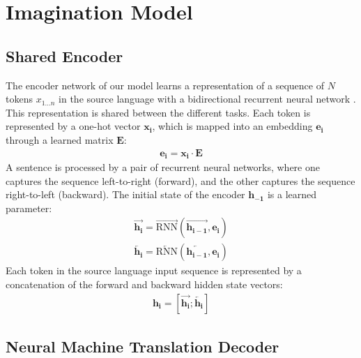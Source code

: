 \section{Imagination Model}

\subsection{Shared Encoder}\label{sec:model:encoder}

The encoder network of our model learns a representation of a
sequence of $N$ tokens $x_{1 \ldots n}$ in the source language with a
bidirectional recurrent neural network \citep{Schuster1997}. This representation is shared between the different tasks. 
Each token is represented by a one-hot vector $\mathbf{x_i}$, which is mapped into an embedding $\mathbf{e_i}$ through a learned matrix
$\mathbf{E}$:
%
\begin{align}
	\mathbf{e_i} = \mathbf{x_i} \cdot \mathbf{E}
\end{align}
%
A sentence is processed by a pair of recurrent neural networks, where one captures the sequence left-to-right (forward), and the other captures the sequence right-to-left (backward). The initial state of the encoder $\mathbf{h_{-1}}$ is a learned parameter:
%
\begin{align}
	\overrightarrow{\mathbf{h_i}} = \overrightarrow{\text{RNN}}(\overrightarrow{\mathbf{h_{i-1}}}, \mathbf{e_i}) \\
    \overleftarrow{\mathbf{h_i}} = \overleftarrow{\text{RNN}}(\overleftarrow{\mathbf{h_{i-1}}}, \mathbf{e_i})
\end{align}
%
Each token in the source language input sequence is represented by a concatenation of the forward and backward hidden state vectors:
%
\begin{align}
	\mathbf{h_i} = [\overrightarrow{\mathbf{h_i}}; \overleftarrow{\mathbf{h_i}}]
\end{align}
%
\subsection{Neural Machine Translation Decoder}

